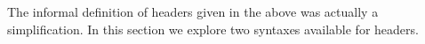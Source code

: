 
The informal definition of headers given in the above was actually a simplification. In
this section we explore two syntaxes available for headers.

